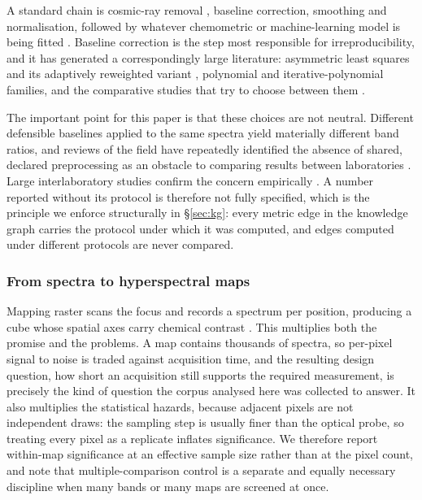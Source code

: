 A standard chain is cosmic-ray removal \cite{whitaker2018simple}, baseline
correction, smoothing \cite{savitzky1964smoothing} and normalisation, followed
by whatever chemometric or machine-learning model is being fitted
\cite{guo2021chemometric,ryabchykov2018analyzing,byrne2016spectral}. Baseline
correction is the step most responsible for irreproducibility, and it has
generated a correspondingly large literature: asymmetric least squares
\cite{eilers2005baseline} and its adaptively reweighted variant
\cite{baek2015arpls}, polynomial and iterative-polynomial families, and the
comparative studies that try to choose between them
\cite{zhu2014review,gautam2015comparison,pan2022analysis}.

The important point for this paper is that these choices are not
neutral. Different defensible baselines applied to the same spectra yield
materially different band ratios, and reviews of the field have repeatedly
identified the absence of shared, declared preprocessing as an obstacle to
comparing results between laboratories
\cite{tanwar2021advances,barton2022chemometrics,ntziouni2022review}. Large
interlaboratory studies confirm the concern empirically
\cite{fornasaro2020surface}. A number reported without its protocol is
therefore not fully specified, which is the principle we enforce structurally
in \S\ref{sec:kg}: every metric edge in the knowledge graph carries the
protocol under which it was computed, and edges computed under different
protocols are never compared.

\subsubsection{From spectra to hyperspectral maps}

Mapping raster scans the focus and records a spectrum per position, producing a
cube whose spatial axes carry chemical contrast
\cite{kallepitis2017quantitative,bergholt2016raman}. This multiplies both the
promise and the problems. A map contains thousands of spectra, so per-pixel
signal to noise is traded against acquisition time, and the resulting design
question, how short an acquisition still supports the required measurement, is
precisely the kind of question the corpus analysed here was collected to
answer. It also multiplies the statistical hazards, because adjacent pixels are
not independent draws: the sampling step is usually finer than the optical
probe, so treating every pixel as a replicate inflates significance. We
therefore report within-map significance at an effective sample size rather
than at the pixel count, and note that multiple-comparison control
\cite{benjamini1995controlling} is a separate and equally necessary discipline
when many bands or many maps are screened at once.

